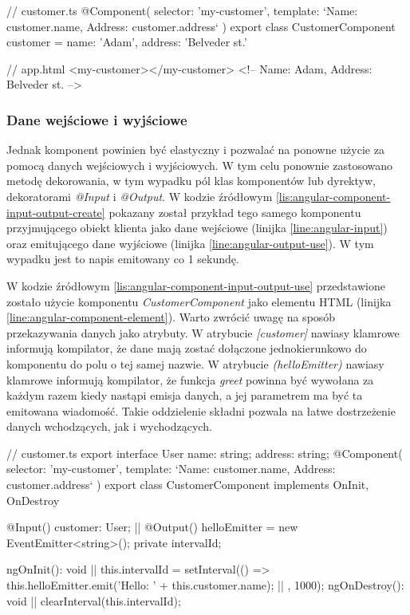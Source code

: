 	\begin{code}[
		language=javascript,
		caption={Użycie komponentu w Angularze (źródło: opracowanie własne)},
		label={lis:angular-component},
		escapechar=|
	]
// customer.ts
@Component({
  selector: 'my-customer',
  template: `Name: {{customer.name}}, Address: {{customer.address}}`
})
export class CustomerComponent {
  customer = {
    name: 'Adam',
    address: 'Belveder st.'
  }
}
  
// app.html
<my-customer></my-customer> <!-- Name: Adam, Address: Belveder st. -->
	\end{code}
	
	\subsubsection{Dane wejściowe i wyjściowe}
	Jednak komponent powinien być elastyczny i pozwalać na ponowne użycie za pomocą danych wejściowych i wyjściowych. W tym celu ponownie zastosowano metodę dekorowania, w tym wypadku pól klas komponentów lub dyrektyw, dekoratorami \textit{@Input} i \textit{@Output}. W kodzie źródłowym \ref{lis:angular-component-input-output-create} pokazany został przykład tego samego komponentu przyjmującego obiekt klienta jako dane wejściowe (linijka \ref{line:angular-input}) oraz emitującego dane wyjściowe (linijka \ref{line:angular-output-use}). W tym wypadku jest to napis emitowany co 1 sekundę.\par
	W kodzie źródłowym \ref{lis:angular-component-input-output-use} przedstawione zostało użycie  komponentu \textit{CustomerComponent} jako elementu HTML (linijka \ref{line:angular-component-element}). Warto zwrócić uwagę na sposób przekazywania danych jako atrybuty. W atrybucie \textit{[customer]} nawiasy klamrowe informują kompilator, że dane mają zostać dołączone jednokierunkowo do komponentu do polu o tej samej nazwie. W atrybucie \textit{(helloEmitter)} nawiasy klamrowe informują kompilator, że funkcja \textit{greet} powinna być wywołana za każdym razem kiedy nastąpi emisja danych, a jej parametrem ma być ta emitowana wiadomość. Takie oddzielenie składni pozwala na łatwe dostrzeżenie danych wchodzących, jak i wychodzących.

	\begin{code}[
		language=javascript,
		caption={Utworzenie komponentu z danymi wejściowymi Angularze (źródło: opracowanie własne)},
		label={lis:angular-component-input-output-create},
		escapechar=|
	]
// customer.ts
export interface User {
  name: string;
  address: string;
}
@Component({
  selector: 'my-customer',
  template: `Name: {{customer.name}}, Address: {{customer.address}}`
})
export class CustomerComponent implements OnInit, OnDestroy {
  @Input() customer: User; |\label{line:angular-input}|
  @Output() helloEmitter = new EventEmitter<string>();
  private intervalId;

  ngOnInit(): void { |\label{line:angular-ngOnInit}|
    this.intervalId = setInterval(() => {
      this.helloEmitter.emit('Hello: ' + this.customer.name); |\label{line:angular-output-use}|
    }, 1000);
  }
  ngOnDestroy(): void { |\label{line:angular-ngOnDestroy}|
    clearInterval(this.intervalId);
  }
}
	\end{code}
	
